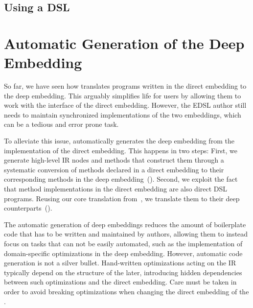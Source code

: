 \subsection{Using a \yy DSL}
\label{sec:using-a-dsl}

\section{Automatic Generation of the Deep Embedding}
\label{sec:deep-gen}

So far, we have seen how \yy translates programs written in the
direct embedding to the deep embedding. This arguably simplifies life
for \edsl users by allowing them to work with the interface of the
direct embedding.  However, the EDSL author still needs to maintain synchronized
 implementations of the two embeddings, which can be a tedious and error prone task.

To alleviate this issue, \yy automatically generates the deep embedding from
the implementation of the direct embedding. This happens in two steps: First, we
generate high-level IR nodes and methods that construct them through a
systematic conversion of methods declared in a direct embedding to their
corresponding methods in the deep embedding~().
%
Second, we exploit the fact that method implementations in the direct
embedding are also direct DSL programs.  Reusing our core translation
from~, we translate them to their deep
counterparts~().


The automatic generation of deep embeddings reduces the amount of
boilerplate code that has to be written and maintained by \edsl
authors, allowing them to instead focus on tasks that can not be
easily automated, such as the implementation of domain-specific
optimizations in the deep embedding.  However, automatic code
generation is not a silver bullet.  Hand-written optimizations acting
on the IR typically depend on the structure of the later, introducing
hidden dependencies between such optimizations and the direct
embedding.  Care must be taken in order to avoid breaking
optimizations when changing the direct embedding of the \edsl.

